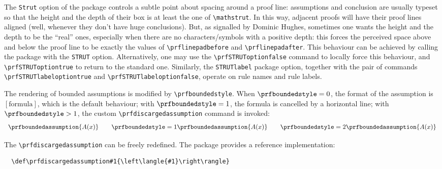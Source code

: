 \documentclass{amsart}
\begin{document}
The \verb|Strut| option of the package controls a subtle point about
spacing around a proof line: assumptions and conclusion are usually
typeset so that the height and the depth of their box is at least the
one of \verb|\mathstrut|. In this way, adjacent proofs will have their
proof lines aligned (well, whenever they don't have huge
conclusions). But, as signalled by Dominic Hughes, sometimes one wants
the height and the depth to be the ``real'' ones, especially when
there are no characters/symbols with a positive depth: this forces the
perceived space above and below the proof line to be exactly the
values of \verb|\prflinepadbefore| and \verb|\prflinepadafter|. This
behaviour can be achieved by calling the package with the \verb|STRUT|
option. Alternatively, one may use the \verb|\prfSTRUToptionfalse|
command to locally force this behaviour, and
\verb|\prfSTRUToptiontrue| to return to the standard one. Similarly,
the \verb|STRUTlabel| package option, together with the pair of
commands \verb|\prfSTRUTlabeloptiontrue| and
\verb|\prfSTRUTlabeloptionfalse|, operate on rule names and rule
labels.\vspace{2ex}

The rendering of bounded assumptions is modified by
\verb|\prfboundedstyle|. When $\verb|\prfboundedstyle| = 0$, the
format of the assumption is $[\mbox{formula}]$, which is the default
behaviour; with $\verb|\prfboundedstyle| = 1$, the formula is
cancelled by a horizontal line; with $\verb|\prfboundedstyle| > 1$,
the custom \verb|\prfdiscargedassumption| command is invoked:
\begin{displaymath}
  \begin{array}{c@{\qquad}c@{\qquad}c}
    \prfboundedassumption{A(x)} &
    {\prfboundedstyle=1\prfboundedassumption{A(x)}} &
    {\prfboundedstyle=2\prfboundedassumption{A(x)}}
  \end{array}
\end{displaymath}

The \verb|\prfdiscargedassumption| can be freely redefined. The
package provides a reference implementation:
\begin{verbatim}
  \def\prfdiscargedassumption#1{\left\langle{#1}\right\rangle}
\end{verbatim}\vspace{2ex}
\end{document}
